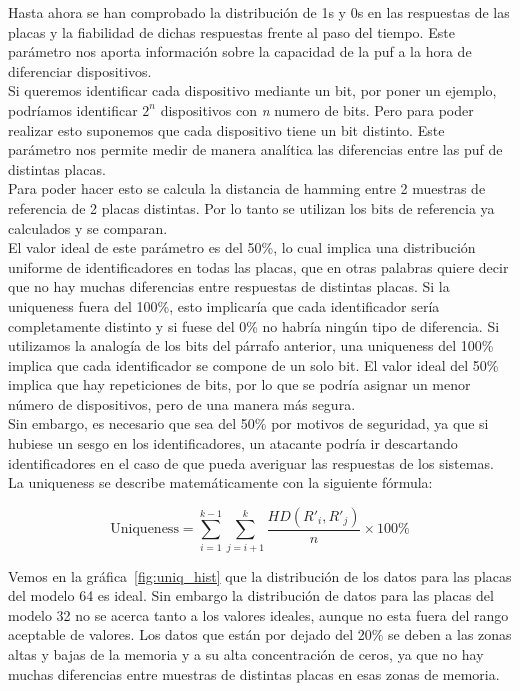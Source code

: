 \documentclass[spanish]{template/minim}
\begin{document}
Hasta ahora se han comprobado la distribución de 1s y 0s en las respuestas de las placas y la fiabilidad de dichas respuestas frente al paso del tiempo. Este parámetro nos aporta información sobre la capacidad de la \gls{puf} a la hora de diferenciar dispositivos.\\

Si queremos identificar cada dispositivo mediante un bit, por poner un ejemplo, podríamos identificar $2^n$ dispositivos con \textit{n} numero de bits. Pero para poder realizar esto suponemos que cada dispositivo tiene un bit distinto. Este parámetro nos permite medir de manera analítica las diferencias entre las \gls{puf} de distintas placas.\\

Para poder hacer esto se calcula la distancia de hamming entre 2 muestras de referencia de 2 placas distintas. Por lo tanto se utilizan los bits de referencia ya calculados y se comparan.\\

El valor ideal de este parámetro es del 50\%, lo cual implica una distribución uniforme de identificadores en todas las placas, que en otras palabras quiere decir que no hay muchas diferencias entre respuestas de distintas placas. Si la uniqueness fuera del 100\%, esto implicaría que cada identificador sería completamente distinto y si fuese del 0\% no habría ningún tipo de diferencia. Si utilizamos la analogía de los bits del párrafo anterior, una uniqueness del 100\% implica que cada identificador se compone de un solo bit. El valor ideal del 50\% implica que hay repeticiones de bits, por lo que se podría asignar un menor número de dispositivos, pero de una manera más segura.\\

Sin embargo, es necesario que sea del 50\% por motivos de seguridad, ya que si hubiese un sesgo en los identificadores, un atacante podría ir descartando identificadores en el caso de que pueda averiguar las respuestas de los sistemas.\\

La uniqueness se describe matemáticamente con la siguiente fórmula:

\begin{equation}
    \text{Uniqueness} = \sum\limits^{k-1}_{i=1} \sum\limits^k_{j=i+1} \frac{HD(R'_i, R'_j)}{n} \times 100\%
    \label{eq:uniqueness}
\end{equation}

Vemos en la gráfica~\ref{fig:uniq_hist} que la distribución de los datos para las placas del modelo 64 es ideal. Sin embargo la distribución de datos para las placas del modelo 32 no se acerca tanto a los valores ideales, aunque no esta fuera del rango aceptable de valores. Los datos que están por dejado del 20\% se deben a las zonas altas y bajas de la memoria y a su alta concentración de ceros, ya que no hay muchas diferencias entre muestras de distintas placas en esas zonas de memoria.\\
\end{document}
